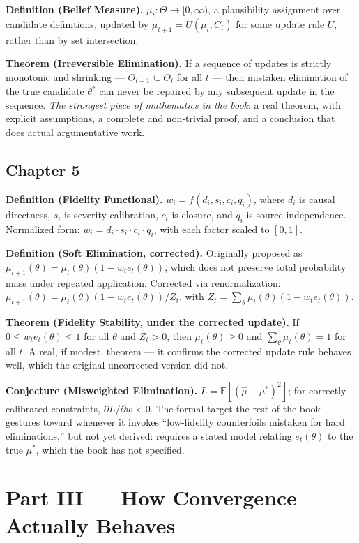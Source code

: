 \textbf{Definition (Belief Measure).} $\mu_t : \Theta \to [0,\infty)$, a plausibility assignment over candidate definitions, updated by $\mu_{t+1} = U(\mu_t, C_t)$ for some update rule $U$, rather than by set intersection.

\textbf{Theorem (Irreversible Elimination).} If a sequence of updates is strictly monotonic and shrinking --- $\Theta_{t+1} \subseteq \Theta_t$ for all $t$ --- then mistaken elimination of the true candidate $\theta^*$ can never be repaired by any subsequent update in the sequence. \emph{The strongest piece of mathematics in the book}: a real theorem, with explicit assumptions, a complete and non-trivial proof, and a conclusion that does actual argumentative work.

\subsection*{Chapter 5}

\textbf{Definition (Fidelity Functional).} $w_i = f(d_i, s_i, c_i, q_i)$, where $d_i$ is causal directness, $s_i$ is severity calibration, $c_i$ is closure, and $q_i$ is source independence. Normalized form: $w_i = d_i \cdot s_i \cdot c_i \cdot q_i$, with each factor scaled to $[0,1]$.

\textbf{Definition (Soft Elimination, corrected).} Originally proposed as $\mu_{t+1}(\theta) = \mu_t(\theta)(1 - w_t e_t(\theta))$, which does not preserve total probability mass under repeated application. Corrected via renormalization: $\mu_{t+1}(\theta) = \mu_t(\theta)(1 - w_t e_t(\theta)) / Z_t$, with $Z_t = \sum_\theta \mu_t(\theta)(1 - w_t e_t(\theta))$.

\textbf{Theorem (Fidelity Stability, under the corrected update).} If $0 \leq w_t e_t(\theta) \leq 1$ for all $\theta$ and $Z_t > 0$, then $\mu_t(\theta) \geq 0$ and $\sum_\theta \mu_t(\theta) = 1$ for all $t$. A real, if modest, theorem --- it confirms the corrected update rule behaves well, which the original uncorrected version did not.

\textbf{Conjecture (Misweighted Elimination).} $L = \mathbb{E}[(\hat\mu - \mu^*)^2]$; for correctly calibrated constraints, $\partial L/\partial w < 0$. The formal target the rest of the book gestures toward whenever it invokes ``low-fidelity counterfoils mistaken for hard eliminations,'' but not yet derived: requires a stated model relating $e_t(\theta)$ to the true $\mu^*$, which the book has not specified.

\section*{Part III --- How Convergence Actually Behaves}

